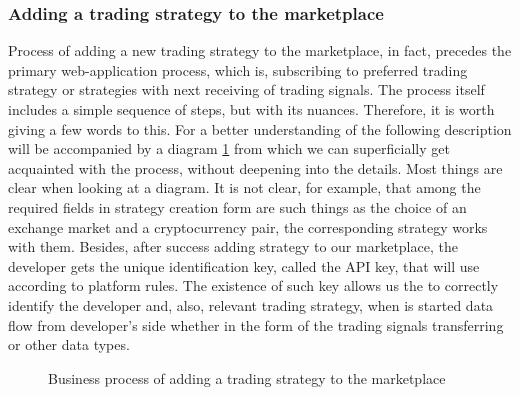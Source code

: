 \documentclass[thesis=B,english]{FITthesis}[2019/03/06]
\begin{document}
\subsubsection{Adding a trading strategy to the marketplace}
Process of adding a new trading strategy to the marketplace, in fact, precedes the primary web-application process, which is, subscribing to preferred trading strategy or strategies with next receiving of trading signals. The process itself includes a simple sequence of steps, but with its nuances. Therefore, it is worth giving a few words to this. For a better understanding of the following description will be accompanied by a diagram \ref{fig:BP_ADD} from which we can superficially get acquainted with the process, without deepening into the details.
Most things are clear when looking at a diagram. It is not clear, for example, that among the required fields in strategy creation form are such things as the choice of an exchange market and a cryptocurrency pair, the corresponding strategy works with them. 
Besides, after success adding strategy to our marketplace, the developer gets the unique identification key, called the API key, that will use according to platform rules. The existence of such key allows us the to correctly identify the developer and, also, relevant trading strategy, when is started data flow from developer's side whether in the form of the trading signals transferring or other data types.

\begin{figure}[!ht]
\centering
\caption{Business process of adding a trading strategy to the marketplace}
\label{fig:BP_ADD}
\end{figure}
\end{document}
